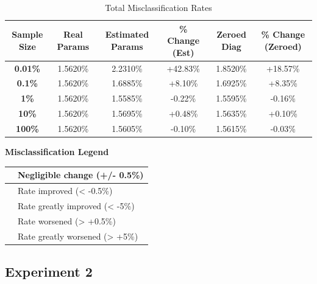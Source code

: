 \documentclass{article}
\begin{document}
\begin{table}[H]
\centering
\small
\caption{Total Misclassification Rates}
\vspace{0.5em}
\begin{tabular}{cccccc}
\toprule
\textbf{Sample Size} & \textbf{Real Params} & \textbf{Estimated Params} & \textbf{\% Change (Est)} & \textbf{Zeroed Diag} & \textbf{\% Change (Zeroed)} \\
\midrule
\textbf{0.01\%} & 1.5620\% & 2.2310\% & \cellcolor{greatworsened}\color{white} +42.83\% & 1.8520\% & \cellcolor{greatworsened}\color{white} +18.57\% \\
\textbf{0.1\%} & 1.5620\% & 1.6885\% & \cellcolor{greatworsened}\color{white} +8.10\% & 1.6925\% & \cellcolor{greatworsened}\color{white} +8.35\% \\
\textbf{1\%} & 1.5620\% & 1.5585\% & \cellcolor{negchange} -0.22\% & 1.5595\% & \cellcolor{negchange} -0.16\% \\
\textbf{10\%} & 1.5620\% & 1.5695\% & \cellcolor{negchange} +0.48\% & 1.5635\% & \cellcolor{negchange} +0.10\% \\
\textbf{100\%} & 1.5620\% & 1.5605\% & \cellcolor{negchange} -0.10\% & 1.5615\% & \cellcolor{negchange} -0.03\% \\
\bottomrule
\end{tabular}
\end{table}

\begin{center}
\textbf{Misclassification Legend} \\
\begin{tabular}{|l|l|}
\hline
\cellcolor{negchange} & Negligible change (+/- 0.5\%) \\ \hline
\cellcolor{improved} & Rate improved (< -0.5\%) \\ \hline
\cellcolor{greatimproved} & Rate greatly improved (< -5\%) \\ \hline
\cellcolor{worsened} & Rate worsened (> +0.5\%) \\ \hline
\cellcolor{greatworsened} & Rate greatly worsened (> +5\%) \\ \hline
\end{tabular}
\end{center}

\subsection{Experiment 2}\label{experiment-2-1}
\end{document}
